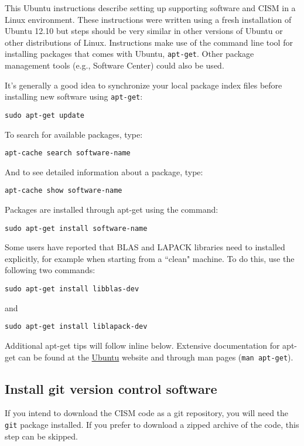 \begin{mdframed}[style=ubuntu] %
This Ubuntu instructions describe setting up supporting software and CISM in a Linux environment.
These instructions were written using a fresh installation of Ubuntu 12.10 but 
steps should be very similar in other versions of Ubuntu or other distributions of Linux.
Instructions make use of the command line tool for installing packages that comes with Ubuntu, 
\texttt{apt-get}.  Other package management tools (e.g., Software Center)
could also be used.

\noindent

It's generally a good idea to synchronize your local package index files before
installing new software using \texttt{apt-get}:

\texttt{sudo apt-get update}

\noindent
To search for available packages, type:

\texttt{apt-cache search software-name}

\noindent
And to see detailed information about a package, type:

\texttt{apt-cache show software-name}

\noindent
Packages are installed through apt-get using the command:

\texttt{sudo apt-get install software-name}

\noindent
Some users have reported that BLAS and LAPACK libraries need to installed explicitly, for example when starting from a ``clean" machine. 
To do this, use the following two commands:

\texttt{sudo apt-get install libblas-dev}

\noindent
and

\texttt{sudo apt-get install liblapack-dev}

\noindent
Additional apt-get tips will follow inline below. Extensive documentation for apt-get 
can be found at the \href{https://help.ubuntu.com/community/AptGet/Howto}{Ubuntu} website
and through man pages (\texttt{man apt-get}).
\end{mdframed}                 %



\subsection{Install git version control software}
If you intend to download the CISM code as a git repository, you will need the \texttt{git} package installed.
If you prefer to download a zipped archive of the code, this step can be skipped.


